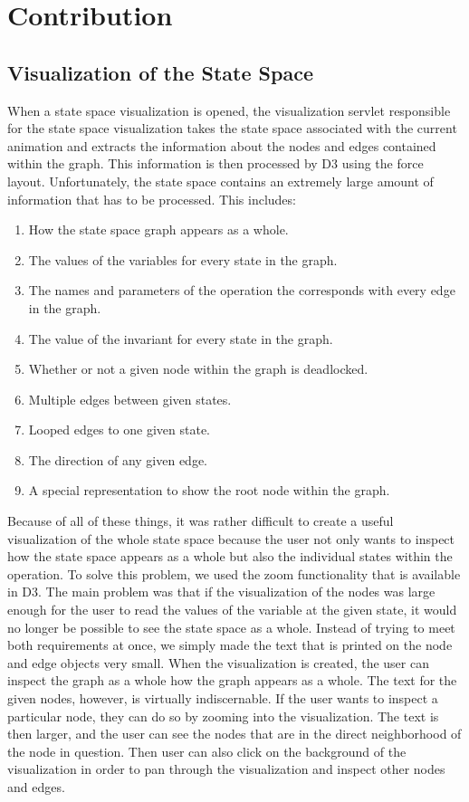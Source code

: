 \section{Contribution}

\subsection{Visualization of the State Space}

When a state space visualization is opened, the visualization servlet responsible for the state space visualization takes the state space associated with the current animation and extracts the information about the nodes and edges contained within the graph. This information is then processed by D3 using the force layout. Unfortunately, the state space contains an extremely large amount of information that has to be processed. This includes:

\begin{enumerate}
\item{How the state space graph appears as a whole.}
\item{The values of the variables for every state in the graph.}
\item{The names and parameters of the operation the corresponds with every edge in the graph.}
\item{The value of the invariant for every state in the graph.}
\item{Whether or not a given node within the graph is deadlocked.}
\item{Multiple edges between given states.}
\item{Looped edges to one given state.}
\item{The direction of any given edge.}
\item{A special representation to show the root node within the graph.}
\end{enumerate}

Because of all of these things, it was rather difficult to create a useful visualization of the whole state space because the user not only wants to inspect how the state space appears as a whole but also the individual states within the operation. To solve this problem, we used the zoom functionality that is available in D3. The main problem was that if the visualization of the nodes was large enough for the user to read the values of the variable at the given state, it would no longer be possible to see the state space as a whole. Instead of trying to meet both requirements at once, we simply made the text that is printed on the node and edge objects very small. When the visualization is created, the user can inspect the graph as a whole how the graph appears as a whole. The text for the given nodes, however, is virtually indiscernable. If the user wants to inspect a particular node, they can do so by zooming into the visualization. The text is then larger, and the user can see the nodes that are in the direct neighborhood of the node in question. Then user can also click on the background of the visualization in order to pan through the visualization and inspect other nodes and edges.

